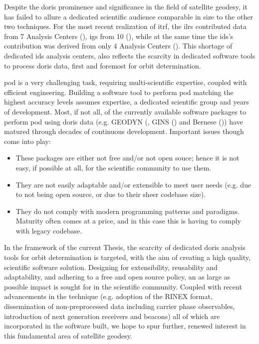 Despite the \gls{doris} prominence and significance in the field of satellite geodesy,
it has failed to allure a dedicated scientific audience comparable in size to 
the other two techniques. For the most recent realization of \gls{itrf}, the 
\gls{ilrs} contributed data from 7 Analysis Centers (\cite{Pavlis2023}), \gls{igs} 
from 10 (\cite{Rebischung2021}), while at the same time the \gls{ids}'s contribution 
was derived from only 4 Analysis Centers (\cite{Moreaux2022}). This shortage of 
dedicated \gls{ids} analysis centers, also reflects the scarcity in dedicated 
software tools to process \gls{doris} data, first and foremost for orbit 
determination.

\gls{pod} is a very challenging task, requiring multi-scientific expertise,
coupled with efficient engineering. Building a software tool to perform \gls{pod} 
matching the highest accuracy levels assumes expertise, a dedicated scientific 
group and years of development. Most, if not all, of the currently available 
software packages to perform \gls{pod} using \gls{doris} data (e.g. GEODYN (\cite{Geodyn2015}, 
GINS (\cite{Gins2013}) and Bernese (\cite{Stepanek2010})) have matured through 
decades of continuous development. Important issues though come into play:
\begin{itemize}
  \item These packages are either not free and/or not open souce; hence it is not 
    easy, if possible at all, for the scientific community to use them.
  \item They are not easily adaptable and/or extensible to meet user needs (e.g. due 
    to not being open source, or due to their sheer codebase size).
  \item They do not comply with modern programming patterns and paradigms. Maturity 
    often comes at a price, and in this case this is having to comply with legacy 
    codebase.
\end{itemize}

In the framework of the current Thesis, the scarcity of dedicated \gls{doris}
analysis tools for orbit determination is targeted, with the aim of creating
a high quality, scientific software solution. Designing for extensibility, 
reusability and adaptability, and adhering to a free and open source policy, an 
as large as possible impact is sought for in the scientific community. Coupled 
with recent advancements in the technique (e.g. adoption of the RINEX format, 
dissemination of non-preprocessed data including carrier phase observables, 
introduction of next generation receivers and beacons) all of which are 
incorporated in the software built, we hope to spur further, renewed interest 
in this fundamental area of satellite geodesy.

